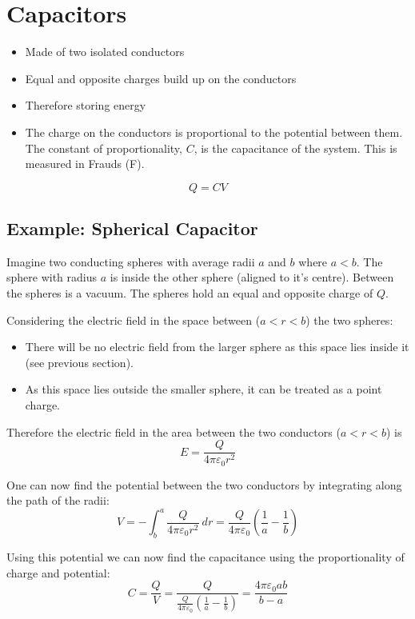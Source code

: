 \documentclass[11pt,a4paper]{report}
\begin{document}
\section{Capacitors}
\begin{itemize}
	\item Made of two isolated conductors
	\item Equal and opposite charges build up on the conductors
	\item Therefore storing energy
	\item The charge on the conductors is proportional to the potential between them. The constant of proportionality, $C$, is the capacitance of the system. This is measured in Frauds (F). 
\end{itemize}
\begin{equation*}
	Q = CV
\end{equation*}

\subsection{Example: Spherical Capacitor}
Imagine two conducting spheres with average radii $a$ and $b$ where $a < b$. The sphere with radius $a$ is inside the other sphere (aligned to it's centre). Between the spheres is a vacuum. The spheres hold an equal and opposite charge of $Q$.

Considering the electric field in the space between ($a < r < b$) the two spheres:
\begin{itemize}
	\item There will be no electric field from the larger sphere as this space lies inside it (see previous section).
	\item As this space lies outside the smaller sphere, it can be treated as a point charge.
\end{itemize}

Therefore the electric field in the area between the two conductors ($a < r < b$) is 
\begin{equation*}
	E = \frac{Q}{4\pi\varepsilon_0r^2}
\end{equation*}

One can now find the potential between the two conductors by integrating along the path of the radii:
\begin{equation*}
	V = -\int_b^a \frac{Q}{4\pi\varepsilon_0r^2} \: dr = \frac{Q}{4\pi\varepsilon_0}\left(\frac{1}{a} - \frac{1}{b}\right)
\end{equation*}

Using this potential we can now find the capacitance using the proportionality of charge and potential:
\begin{equation*}
	C = \frac{Q}{V} = \frac{Q}{\frac{Q}{4\pi\varepsilon_0}\left(\frac{1}{a} - \frac{1}{b}\right)} = \frac{4\pi\varepsilon_0ab}{b-a}
\end{equation*}
\end{document}
